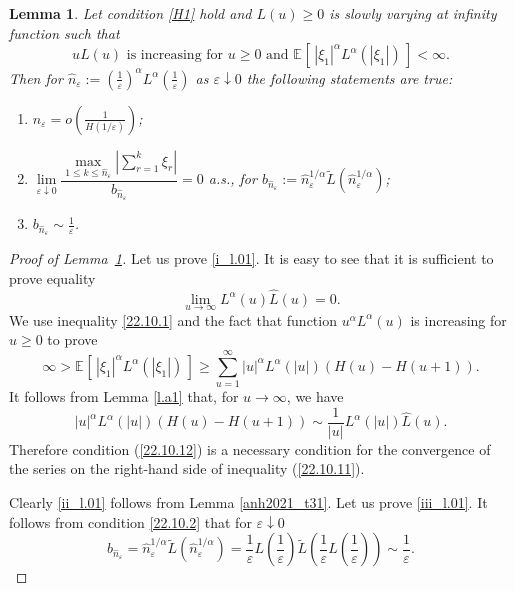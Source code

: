 \documentclass{article}
\makeatletter
\theoremstyle{plain}
\newtheorem{lemma}[theorem]{Lemma}
\theoremstyle{definition}
\theoremstyle{remark}
\newcommand{\e}[2][]{{\mathbb{E}_{#1}\left[ \, #2 \,\right] }} %
\newcommand{\beq}{\begin{equation}}
\newcommand{\eeq}{\end{equation}}
\def\namedlabel#1#2{\begingroup
    #2%
    \def\@currentlabel{#2}%
    \phantomsection\label{#1}\endgroup
}
\makeatother
\begin{document}
\begin{lemma} \label{l.01} Let condition \ref{H1} hold and $L(u) \geqslant 0$ is slowly varying at infinity function such that
\beq\label{22.10.1}
u L(u) \text{ is increasing for } u\geqslant 0 \text{ and } \e{|\xi_1|^\alpha L^\alpha(|\xi_1|)}<\infty.
\eeq
Then for $\hat{n}_\varepsilon:=\left(\frac{1}{\varepsilon}\right)^\alpha L^\alpha\left(\frac{1}{\varepsilon}\right)$ as $\varepsilon\downarrow 0$ the following statements are true:
\begin{enumerate}
\item[\namedlabel{i_l.01}{$(i)$}] $\hat{n}_\varepsilon=o\left(\frac{1}{H(1/\varepsilon)}\right)$;
\item[\namedlabel{ii_l.01}{$(ii)$}] 
$\lim\limits_{\varepsilon\downarrow 0}
\dfrac{\max\limits_{1\leqslant k \leqslant \hat{n}_\varepsilon}\left|\sum\limits_{r=1}^k\xi_r\right|}{b_{\hat{n}_\varepsilon}}=0$ a.s.,
for $b_{\hat{n}_\varepsilon}:=\hat{n}_\varepsilon^{1/\alpha}\widetilde{L}(\hat{n}_\varepsilon^{1/\alpha})$;
\item[\namedlabel{iii_l.01}{$(iii)$}]  $b_{\hat{n}_\varepsilon}\sim \frac{1}{\varepsilon}$.
\end{enumerate}
\end{lemma}

\begin{proof}[Proof of Lemma~\ref{l.01}]
Let us prove \ref{i_l.01}.
It is easy to see that it is sufficient to prove equality
\beq\label{22.10.12}
\lim_{u\rightarrow\infty}L^\alpha(u)\widehat{L}(u)=0.
\eeq
We use inequality \eqref{22.10.1} and the fact that function $u^\alpha L^\alpha(u)$ is increasing for $u\geqslant 0$ to prove
\beq\label{22.10.11}
\infty>\e{|\xi_1|^\alpha L^\alpha(|\xi_1|)}\geq
\sum\limits_{u=1}^\infty|u|^\alpha L^\alpha(|u|)(H(u)-H(u+1)).
\eeq
It follows from Lemma \ref{l.a1} that, for $u\rightarrow\infty$, we have
$$
|u|^\alpha L^\alpha(|u|)(H(u)-H(u+1))\sim \frac{1}{|u|}L^\alpha(|u|)\widehat{L}(u).
$$
Therefore condition (\ref{22.10.12}) is a necessary condition for the convergence of the series on the right-hand side of inequality (\ref{22.10.11}).


Clearly \ref{ii_l.01} follows from Lemma \ref{anh2021_t31}. Let us prove \ref{iii_l.01}.
It follows from condition \eqref{22.10.2} that for $\varepsilon\downarrow0$
$$
b_{\hat{n}_\varepsilon}=\hat{n}^{1/\alpha}_\varepsilon \widetilde{L}(\hat{n}^{1/\alpha}_\varepsilon)
=\frac{1}{\varepsilon}L\left(\frac{1}{\varepsilon}\right)
\widetilde{L}\left(\frac{1}{\varepsilon}L\left(\frac{1}{\varepsilon}\right)\right)
\sim\frac{1}{\varepsilon}.
$$
\end{proof} 
\end{document}
